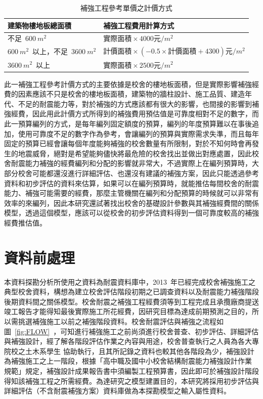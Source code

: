 \setlength{\tabcolsep}{1em}
{\renewcommand{\arraystretch}{1.5}
\begin{table}[hbtp]
  \begin{center}
    \caption{補強工程參考單價之計價方式}
    \label{tab:cost_result_table}
    \begin{tabular}{l l}
      \hline
      建築物樓地板總面積 & 補強工程費用計算方式 \\
      \hline
      不足~$600~m^2$ & $\text{實際面積} \times 4000 \text{元}/m^2$ \\
      $600~m^2$~以上，不足~$3600~m^2$ & $\text{計價面積} \times (-0.5 \times \text{計價面積} + 4300) \text{元}/m^2$ \\
      $3600~m^2$~以上 & $\text{實際面積} \times 2500 \text{元}/m^2$ \\
      \hline
      \end{tabular}
  \end{center}
\end{table}
}

此一補強工程參考計價方式的主要依據是校舍的樓地板面積，但是實際影響補強經費的因素應該不只是校舍的樓地板面積，建築物的牆柱設計、施工品質、建造年代、不足的耐震能力等，對於補強的方式應該都有很大的影響，也間接的影響到補強經費，因此用此計價方式所得到的補強費用預估值是可靠度相對不足的數字，而此一預算編列的方式，是每年編列固定額度的預算，編列的年度預算難以在事後追加，使用可靠度不足的數字作為參考，會讓編列的預算與實際需求失準，而且每年固定的預算已經會讓每個年度能夠補強的校舍數量有所限制，對於不知何時會再發生的地震威脅，絕對是希望能夠儘快將最危險的校舍找出並做出對應處置，因此校舍耐震能力補強的經費編列和分配的影響就非常大，不過實際上在編列預算時，大部分校舍可能都還沒進行詳細評估、也還沒有建議的補強方案，因此只能透過參考資料和初步評估的資料來估算，如果可以在編列預算時，就能推估每間校舍的耐震能力、補強可能需要的經費，那麼主管機關在編列和分配預算的時候就可以非常有效率的來編列，因此本研究還試著找出校舍的基礎設計參數與其補強經費間的關係模型，透過這個模型，應該可以從校舍的初步評估資料得到一個可靠度較高的補強經費推估值。


\section{資料前處理}

本資料探勘分析所使用之資料為耐震資料庫中，2013~年已經完成校舍補強施工之典型校舍資料，構想為建立校舍評估階段初期之已調查資料以及耐震能力補強階段後期資料間之關係模型。校舍耐震之補強工程經費須等到工程完成且承攬廠商提送竣工報告才能得知最後實際施工所花經費，因研究目標為達成前期預測之目的，所以需挑選補強施工以前之補強階段資料。校舍耐震評估與補強之流程如圖~\ref{fig:FLOW}~，可知進行補強施工之前尚須進行校舍普查、初步評估、詳細評估與補強設計，經了解各階段評估作業之內容與用途，校舍普查執行之人員為各大專院校之土木系學生 協助執行，且其所記錄之資料也較其他各階段為少，補強設計為補強施工之上一階段，根據「高中職及國中小校舍結構耐震能力補強設計作業 規範」規定，補強設計成果報告書中須編製工程預算書，因此即可於補強設計階段得知該補強工程之所需經費。為達研究之模型建置目的，本研究將採用初步評估與詳細評估（不含耐震補強方案）資料庫做為本探勘模型之輸入屬性資料。

